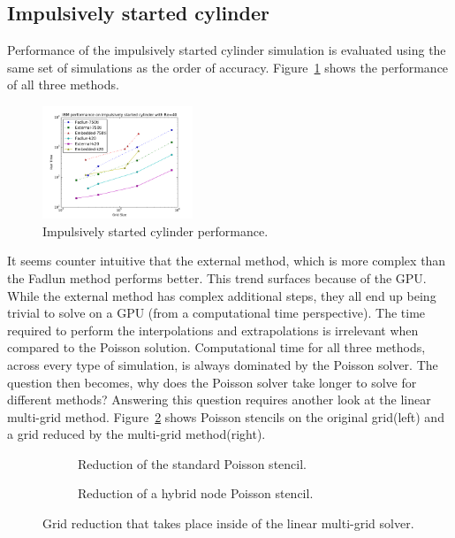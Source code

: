 \subsection{Impulsively started cylinder}

Performance of the impulsively started cylinder simulation is evaluated using the same set of simulations as the order of accuracy. 
Figure~\ref{fig:cyperf} shows the performance of all three methods. 
\begin{figure}[!htb]
	\centering
	\includegraphics[width=0.4\textwidth]{cylinder_performance}
	\caption{Impulsively started cylinder performance.}
	\label{fig:cyperf}
\end{figure}
It seems counter intuitive that the external method, which is more complex than the Fadlun method performs better. 
This trend surfaces because of the GPU. 
While the external method has complex additional steps, they all end up being trivial to solve on a GPU (from a computational time perspective). 
The time required to perform the interpolations and extrapolations is irrelevant when compared to the Poisson solution. 
Computational time for all three methods, across every type of simulation, is always dominated by the Poisson solver. 
The question then becomes, why does the Poisson solver take longer to solve for different methods? 
Answering this question requires another look at the linear multi-grid method. 
Figure~\ref{fig:gridreduce} shows Poisson stencils on the original grid(left) and a grid reduced by the multi-grid method(right). 
\begin{figure}[!htb]
	\centering
	\begin{subfigure}{0.6\textwidth}
		
		\caption{Reduction of the standard Poisson stencil.}
	\end{subfigure}
	
	\begin{subfigure}{0.6\textwidth}
		
		\caption{Reduction of a hybrid node Poisson stencil.}
	\end{subfigure}
	\caption{Grid reduction that takes place inside of the linear multi-grid solver.}
	\label{fig:gridreduce}
\end{figure}
